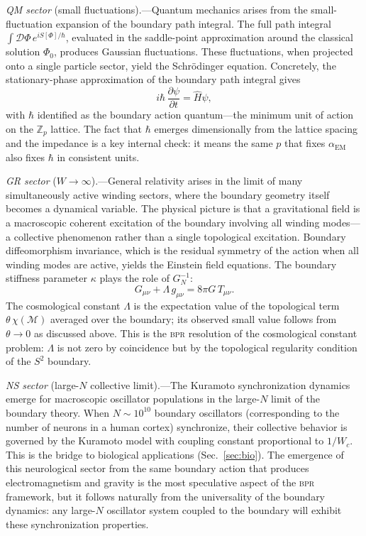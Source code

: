 \documentclass[aps,prd,twocolumn,superscriptaddress,longbibliography,nofootinbib]{revtex4-2}
\newcommand{\Zp}{\mathbb{Z}_p}
\newcommand{\Stwo}{S^2}
\newcommand{\alphaEM}{\alpha_{\mathrm{EM}}}
\newcommand{\Wc}{W_{\!c}}
\newcommand{\bpr}{\textsc{bpr}}
\begin{document}
\textit{QM sector} (small fluctuations).---Quantum mechanics arises
from the small-fluctuation expansion of the boundary path integral.
The full path integral $\int \mathcal{D}\Phi\, e^{iS[\Phi]/\hbar}$,
evaluated in the saddle-point approximation around the classical
solution $\Phi_0$, produces Gaussian fluctuations.  These
fluctuations, when projected onto a single particle sector, yield the
Schr\"odinger equation.  Concretely, the stationary-phase
approximation of the boundary path integral gives
\begin{equation}
i\hbar\, \frac{\partial\psi}{\partial t} = \hat{H}\psi,
\label{eq:schrodinger}
\end{equation}
with $\hbar$ identified as the boundary action quantum---the minimum
unit of action on the $\Zp$ lattice.  The fact that $\hbar$ emerges
dimensionally from the lattice spacing and the impedance is a key
internal check: it means the same $p$ that fixes $\alphaEM$ also
fixes $\hbar$ in consistent units.

\textit{GR sector} ($W \to \infty$).---General relativity arises in
the limit of many simultaneously active winding sectors, where the
boundary geometry itself becomes a dynamical variable.  The physical
picture is that a gravitational field is a macroscopic coherent
excitation of the boundary involving all winding modes---a collective
phenomenon rather than a single topological excitation.  Boundary
diffeomorphism invariance, which is the residual symmetry of the
action when all winding modes are active, yields the Einstein field
equations.  The boundary stiffness parameter $\kappa$ plays the role
of $G_N^{-1}$:
\begin{equation}
G_{\mu\nu} + \Lambda\, g_{\mu\nu} = 8\pi G\, T_{\mu\nu}.
\label{eq:einstein}
\end{equation}
The cosmological constant $\Lambda$ is the expectation value of the
topological term $\theta\, \chi(\mathcal{M})$ averaged over the
boundary; its observed small value follows from $\theta \to 0$ as
discussed above.  This is the \bpr{} resolution of the cosmological
constant problem: $\Lambda$ is not zero by coincidence but by the
topological regularity condition of the $\Stwo$ boundary.

\textit{NS sector} (large-$N$ collective limit).---The Kuramoto
synchronization dynamics emerge for macroscopic oscillator
populations in the large-$N$ limit of the boundary theory.  When
$N \sim 10^{10}$ boundary oscillators (corresponding to the number of
neurons in a human cortex) synchronize, their collective behavior is
governed by the Kuramoto model with coupling constant proportional to
$1/\Wc$.  This is the bridge to biological applications
(Sec.~\ref{sec:bio}).  The emergence of this neurological sector from
the same boundary action that produces electromagnetism and gravity
is the most speculative aspect of the \bpr{} framework, but it
follows naturally from the universality of the boundary dynamics:
any large-$N$ oscillator system coupled to the boundary will exhibit
these synchronization properties.
\end{document}
